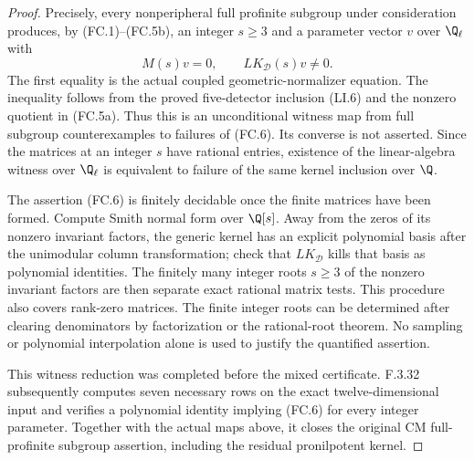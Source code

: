 \begin{proof}
Precisely, every nonperipheral full
profinite subgroup under consideration
produces, by (FC.1)--(FC.5b), an integer
$s\geq3$ and a parameter vector $v$ over
$\Q_\ell$ with
\[
               M(s)v=0,\qquad LK_{\mathcal D}(s)v\ne0.
                                                               \tag{FC.7}
\]
The first equality is the actual coupled
geometric-normalizer equation. The
inequality follows from the proved
five-detector inclusion (LI.6) and the
nonzero quotient in (FC.5a). Thus this
is an unconditional witness map from
full subgroup counterexamples to failures
of (FC.6). Its converse is not asserted.
Since the matrices at an integer $s$
have rational entries, existence of the
linear-algebra witness over $\Q_\ell$
is equivalent to failure of the same
kernel inclusion over $\Q$.

The assertion (FC.6) is finitely decidable
once the finite matrices have been formed.
Compute Smith normal form over $\Q[s]$.
Away from the zeros of its nonzero invariant
factors, the generic kernel has an explicit
polynomial basis after the unimodular
column transformation; check that
$LK_{\mathcal D}$ kills that basis as
polynomial identities. The finitely many
integer roots $s\geq3$ of the nonzero
invariant factors are then separate exact
rational matrix tests. This procedure also
covers rank-zero matrices. The finite
integer roots can be determined after
clearing denominators by factorization or
the rational-root theorem. No sampling
or polynomial interpolation alone is
used to justify the quantified assertion.

This witness reduction was completed before the mixed
certificate. F.3.32 subsequently computes seven necessary
rows on the exact twelve-dimensional input and verifies
a polynomial identity implying (FC.6) for every integer
parameter. Together with the actual maps above, it closes
the original CM full-profinite subgroup assertion, including
the residual pronilpotent kernel.

\end{proof}




